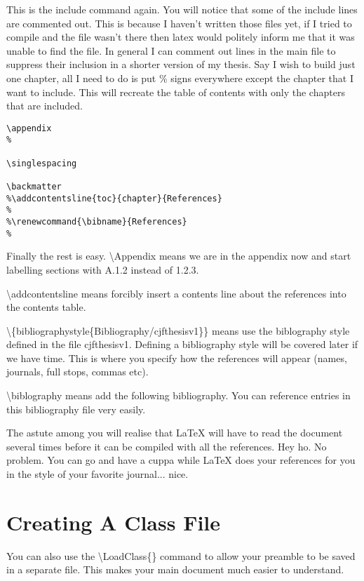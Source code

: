 This is the include command again. You will notice that some of the include lines are commented out. This is because I haven't written those files yet, if I tried to compile and the file wasn't there then latex would politely inform me that it was unable to find the file. In general I can comment out lines in the main file to suppress their inclusion in a shorter version of my thesis. Say I wish to build just one chapter, all I need to do is put \% signs everywhere except the chapter that I want to include. This will recreate the table of contents with only the chapters that are included.

\pagebreak

\begin{verbatim}
\appendix
%

\singlespacing

\backmatter
%\addcontentsline{toc}{chapter}{References}
%
%\renewcommand{\bibname}{References}
%
\end{verbatim}

Finally the rest is easy. {\textbackslash}Appendix means we are in the appendix now and start labelling sections with A.1.2 instead of 1.2.3.  

{\textbackslash}addcontentsline means forcibly insert a contents line about the references into the contents table. 

{\textbackslash}\{bibliographystyle\{Bibliography/cjfthesisv1\}\} means use the biblography style defined in the file cjfthesisv1. Defining a bibliography style will be covered later if we have time. This is where you specify how the references will appear (names, journals, full stops, commas etc).

{\textbackslash}biblography means add the following bibliography.  You can reference entries in this bibliography file very easily.

The astute among you will realise that LaTeX will have to read the document several times before it can be compiled with all the references.  Hey ho. No problem. You can go and have a cuppa while LaTeX does your references for you in the style of your favorite journal... nice.

\pagebreak
\section{Creating A Class File}
You can also use the {\textbackslash}LoadClass\{\} command to allow your preamble to be saved in a separate file. This makes your main document much easier to understand.


